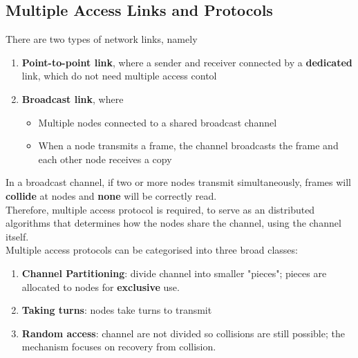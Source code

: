 \documentclass[12pt]{article}
\theoremstyle{definition}
\begin{document}
\subsection{Multiple Access Links and Protocols}
There are two types of network links, namely
\begin{enumerate}
  \item \textbf{Point-to-point link}, where a sender and receiver connected by a \textbf{dedicated} link, which do not need multiple access contol
  \item \textbf{Broadcast link}, where
  \begin{itemize}
    \item Multiple nodes connected to a shared broadcast channel
    \item When a node transmits a frame, the channel broadcasts the frame and each other node receives a copy
  \end{itemize}
\end{enumerate}
In a broadcast channel, if two or more nodes transmit simultaneously, frames will \textbf{collide} at nodes and \textbf{none} will be correctly read.\\
Therefore, multiple access protocol is required, to serve as an distributed algorithms that determines how the nodes share the channel, using the channel itself.\\
Multiple access protocols can be categorised into three broad classes:
\begin{enumerate}
  \item \textbf{Channel Partitioning}: divide channel into smaller "pieces"; pieces are allocated to nodes for \textbf{exclusive} use.
  \item \textbf{Taking turns}: nodes take turns to transmit
  \item \textbf{Random access}: channel are not divided so collisions are still possible; the mechanism focuses on recovery from collision.
\end{enumerate}
\end{document}
